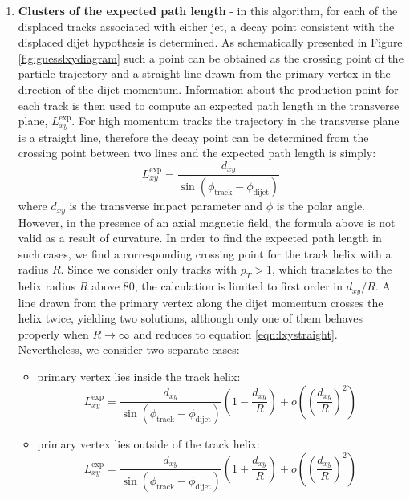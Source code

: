 \begin{enumerate}
\item{\bf Clusters of the expected path length}  
\label{subsec:Clusters}
- in this algorithm, for each of the displaced tracks associated with either jet, a decay point consistent 
with the displaced dijet hypothesis 
is determined. As schematically presented in Figure 
\ref{fig:guesslxydiagram} such a point 
 can be obtained as the crossing point of   
the particle trajectory and a straight line drawn from the primary vertex in the direction of the dijet momentum.  
Information about the production point for each track is then used to compute an expected path length in the
transverse plane, $L_{xy}^\text{exp}$.  
For high momentum tracks the trajectory in the transverse plane is a straight line,
 therefore the decay point can be determined from the crossing point between two lines
 and the expected path length is simply:
\begin{equation}
 L_{xy}^\text{exp}=\frac{d_{xy}}{\sin(\phi_\text{track} - \phi_\text{dijet})}
\label{eqn:lxystraight}
\end{equation}
where $d_{xy}$ is the transverse impact parameter and $\phi$ is the polar angle. However, 
in the presence of an axial magnetic field, the formula above is not valid as a result of
curvature. In order to find the expected path length in such cases,
 we find a corresponding crossing point for the track helix with a radius $R$. Since we consider only
tracks with $p_T>$1\GeV, which translates to the helix radius $R$ above 80\cm, 
the calculation is limited to first order in 
$d_{xy}/R$. 
 A line drawn from the primary vertex along the dijet momentum crosses the helix twice, yielding
 two solutions, although only one of them behaves properly when $R \to \infty$ 
and reduces to equation \ref{eqn:lxystraight}. Nevertheless, we consider two  
separate cases:
\begin{itemize}
 \item primary vertex lies inside the track helix:
\begin{equation}
 L_{xy}^\text{exp} = \frac{d_{xy}}{\sin\left(\phi_\text{track} - \phi_\text{dijet}\right)} \left(1 - \frac{d_{xy}}{R}\right) + o\left(\left(\frac{d_{xy}}{R}\right)^2\right)
\end{equation} 
 \item primary vertex lies outside of the track helix:
\begin{equation}
 L_{xy}^\text{exp} = \frac{d_{xy}}{\sin\left(\phi_\text{track} - \phi_\text{dijet}\right)} \left(1 + \frac{d_{xy}}{R}\right) + o\left(\left(\frac{d_{xy}}{R}\right)^2\right)

\end{equation}
\end{itemize}
\end{enumerate}
